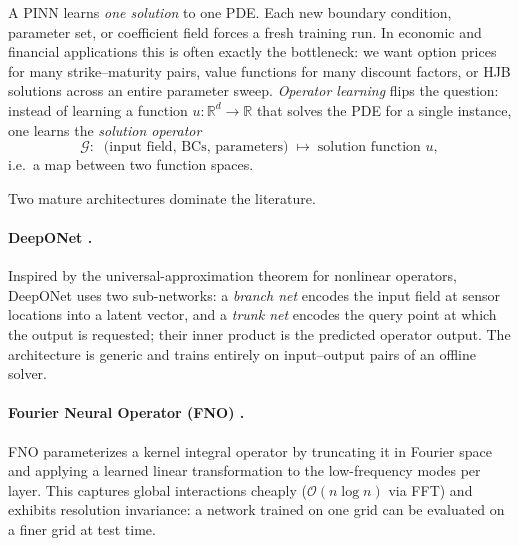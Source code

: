 \documentclass[11pt,a4paper]{report}
\begin{document}
\medskip
A PINN learns \emph{one solution} to one PDE.  Each new boundary condition, parameter set, or coefficient field forces a fresh training run.  In economic and financial applications this is often exactly the bottleneck: we want option prices for many strike--maturity pairs, value functions for many discount factors, or HJB solutions across an entire parameter sweep.  \emph{Operator learning} flips the question: instead of learning a function $u : \mathbb{R}^d \to \mathbb{R}$ that solves the PDE for a single instance, one learns the \emph{solution operator}
\[
   \mathcal{G}: \;\;\text{(input field, BCs, parameters)} \;\longmapsto\; \text{solution function } u,
\]
i.e.\ a map between two function spaces.

Two mature architectures dominate the literature.

\paragraph{DeepONet \citep{lu2021learning}.}  Inspired by the universal-approximation theorem for nonlinear operators, DeepONet uses two sub-networks: a \emph{branch net} encodes the input field at sensor locations into a latent vector, and a \emph{trunk net} encodes the query point at which the output is requested; their inner product is the predicted operator output.  The architecture is generic and trains entirely on input--output pairs of an offline solver.

\paragraph{Fourier Neural Operator (FNO) \citep{li2021fourier}.}  FNO parameterizes a kernel integral operator by truncating it in Fourier space and applying a learned linear transformation to the low-frequency modes per layer.  This captures global interactions cheaply ($\mathcal{O}(n\log n)$ via FFT) and exhibits resolution invariance: a network trained on one grid can be evaluated on a finer grid at test time.
\end{document}
